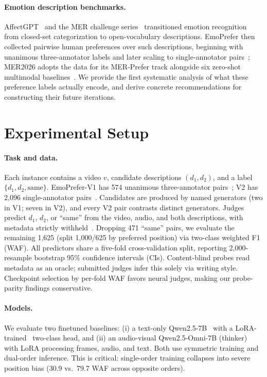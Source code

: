 \documentclass[sigconf,screen]{acmart}
\newcommand{\waf}{WAF\xspace}
\begin{document}
\paragraph{Emotion description benchmarks.}
AffectGPT~\cite{lian2025affectgpt} and the MER challenge series~\cite{lian2023mer,lian2024mer,lian2025mer} transitioned emotion recognition from closed-set categorization to open-vocabulary descriptions. EmoPrefer then collected pairwise human preferences over such descriptions, beginning with unanimous three-annotator labels and later scaling to single-annotator pairs~\cite{lian2025emoprefer}; MER2026 adopts the data for its MER-Prefer track alongside six zero-shot multimodal baselines~\cite{lian2026mer,xu2025qwen25omni}. We provide the first systematic analysis of what these preference labels actually encode, and derive concrete recommendations for constructing their future iterations.

\section{Experimental Setup}
\paragraph{Task and data.}
Each instance contains a video $v$, candidate descriptions $(d_1, d_2)$, and a label $\{d_1, d_2, \mathrm{same}\}$. EmoPrefer-V1 has 574 unanimous three-annotator pairs~\cite{lian2025emoprefer}; V2 has 2,096 single-annotator pairs~\cite{lian2026mer}. Candidates are produced by named generators (two in V1; seven in V2), and every V2 pair contrasts distinct generators. Judges predict $d_1$, $d_2$, or ``same'' from the video, audio, and both descriptions, with metadata strictly withheld~\cite{lian2026mer}. Dropping 471 ``same'' pairs, we evaluate the remaining 1,625 (split 1,000/625 by preferred position) via two-class weighted F1 (\waf). All predictors share a five-fold cross-validation split, reporting 2,000-resample bootstrap 95\% confidence intervals (CIs). Content-blind probes read metadata as an oracle; submitted judges infer this solely via writing style. Checkpoint selection by per-fold \waf favors neural judges, making our probe-parity findings conservative.

\paragraph{Models.}
We evaluate two finetuned baselines: (i) a text-only Qwen2.5-7B~\cite{qwen2025qwen25technicalreport} with a LoRA-trained~\cite{hu2022lora} two-class head, and (ii) an audio-visual Qwen2.5-Omni-7B (thinker) with LoRA processing frames, audio, and text. Both use symmetric training and dual-order inference. This is critical: single-order training collapses into severe position bias (30.9 vs.\ 79.7 \waf across opposite orders).
\end{document}
